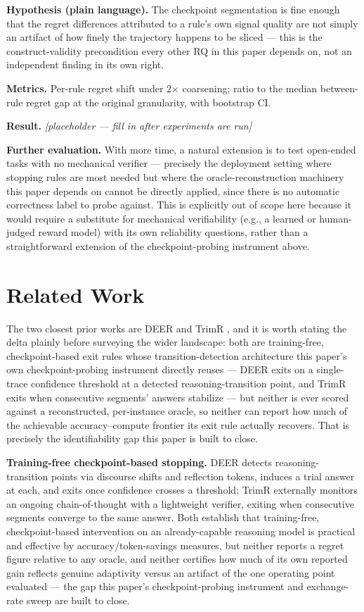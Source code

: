 \documentclass[11pt]{article}
\newcommand{\ph}{\textit{[placeholder --- fill in after experiments are run]}}
\begin{document}
\textbf{Hypothesis (plain language).} The checkpoint segmentation is fine enough that the regret differences attributed to a rule's own signal quality are not simply an artifact of how finely the trajectory happens to be sliced --- this is the construct-validity precondition every other RQ in this paper depends on, not an independent finding in its own right.

\textbf{Metrics.} Per-rule regret shift under 2$\times$ coarsening; ratio to the median between-rule regret gap at the original granularity, with bootstrap CI.

\textbf{Result.} \ph

\vspace{0.5em}
\noindent\textbf{Further evaluation.} With more time, a natural extension is to test open-ended tasks with no mechanical verifier --- precisely the deployment setting where stopping rules are most needed but where the oracle-reconstruction machinery this paper depends on cannot be directly applied, since there is no automatic correctness label to probe against. This is explicitly out of scope here because it would require a substitute for mechanical verifiability (e.g., a learned or human-judged reward model) with its own reliability questions, rather than a straightforward extension of the checkpoint-probing instrument above.

\section{Related Work}

The two closest prior works are DEER \citep{DEER2607} and TrimR \citep{TrimR2607}, and it is worth stating the delta plainly before surveying the wider landscape: both are training-free, checkpoint-based exit rules whose transition-detection architecture this paper's own checkpoint-probing instrument directly reuses --- DEER exits on a single-trace confidence threshold at a detected reasoning-transition point, and TrimR exits when consecutive segments' answers stabilize --- but neither is ever scored against a reconstructed, per-instance oracle, so neither can report how much of the achievable accuracy--compute frontier its exit rule actually recovers. That is precisely the identifiability gap this paper is built to close.

\textbf{Training-free checkpoint-based stopping.} DEER \citep{DEER2607} detects reasoning-transition points via discourse shifts and reflection tokens, induces a trial answer at each, and exits once confidence crosses a threshold; TrimR \citep{TrimR2607} externally monitors an ongoing chain-of-thought with a lightweight verifier, exiting when consecutive segments converge to the same answer. Both establish that training-free, checkpoint-based intervention on an already-capable reasoning model is practical and effective by accuracy/token-savings measures, but neither reports a regret figure relative to any oracle, and neither certifies how much of its own reported gain reflects genuine adaptivity versus an artifact of the one operating point evaluated --- the gap this paper's checkpoint-probing instrument and exchange-rate sweep are built to close.
\end{document}
